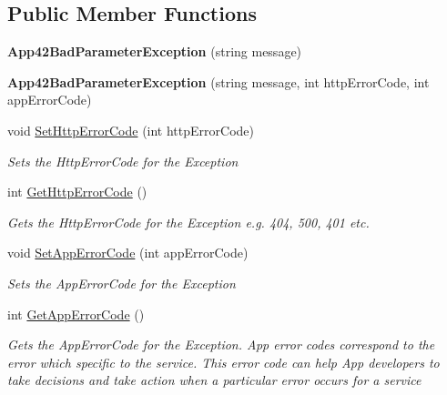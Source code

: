 \subsection*{Public Member Functions}
\begin{DoxyCompactItemize}
\item 
\hypertarget{classcom_1_1shephertz_1_1app42_1_1paas_1_1sdk_1_1windows_1_1_app42_bad_parameter_exception_af09252ff0ba3d575d79a9652b5a64adc}{{\bfseries App42\+Bad\+Parameter\+Exception} (string message)}\label{classcom_1_1shephertz_1_1app42_1_1paas_1_1sdk_1_1windows_1_1_app42_bad_parameter_exception_af09252ff0ba3d575d79a9652b5a64adc}

\item 
\hypertarget{classcom_1_1shephertz_1_1app42_1_1paas_1_1sdk_1_1windows_1_1_app42_bad_parameter_exception_aadb49ced1cc9a172e603c94e069266a3}{{\bfseries App42\+Bad\+Parameter\+Exception} (string message, int http\+Error\+Code, int app\+Error\+Code)}\label{classcom_1_1shephertz_1_1app42_1_1paas_1_1sdk_1_1windows_1_1_app42_bad_parameter_exception_aadb49ced1cc9a172e603c94e069266a3}

\item 
void \hyperlink{classcom_1_1shephertz_1_1app42_1_1paas_1_1sdk_1_1windows_1_1_app42_bad_parameter_exception_a25d38010f4b3c1dbef7daebd1323e1c2}{Set\+Http\+Error\+Code} (int http\+Error\+Code)
\begin{DoxyCompactList}\small\item\em Sets the Http\+Error\+Code for the Exception \end{DoxyCompactList}\item 
int \hyperlink{classcom_1_1shephertz_1_1app42_1_1paas_1_1sdk_1_1windows_1_1_app42_bad_parameter_exception_a30033557a5efced012aa497b67a431d7}{Get\+Http\+Error\+Code} ()
\begin{DoxyCompactList}\small\item\em Gets the Http\+Error\+Code for the Exception e.\+g. 404, 500, 401 etc. \end{DoxyCompactList}\item 
void \hyperlink{classcom_1_1shephertz_1_1app42_1_1paas_1_1sdk_1_1windows_1_1_app42_bad_parameter_exception_a550f5d619ccedcbef28342baec710e2c}{Set\+App\+Error\+Code} (int app\+Error\+Code)
\begin{DoxyCompactList}\small\item\em Sets the App\+Error\+Code for the Exception \end{DoxyCompactList}\item 
int \hyperlink{classcom_1_1shephertz_1_1app42_1_1paas_1_1sdk_1_1windows_1_1_app42_bad_parameter_exception_a56cb2a860f4ad64beeba92cbbbfabb6a}{Get\+App\+Error\+Code} ()
\begin{DoxyCompactList}\small\item\em Gets the App\+Error\+Code for the Exception. App error codes correspond to the error which specific to the service. This error code can help App developers to take decisions and take action when a particular error occurs for a service \end{DoxyCompactList}\end{DoxyCompactItemize}


